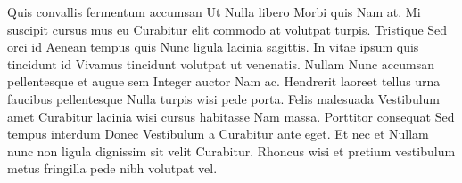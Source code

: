 Quis convallis fermentum accumsan Ut Nulla libero Morbi quis Nam at. Mi suscipit cursus mus eu Curabitur elit commodo at volutpat turpis. Tristique Sed orci id Aenean tempus quis Nunc ligula lacinia sagittis. In vitae ipsum quis tincidunt id Vivamus tincidunt volutpat ut venenatis. Nullam Nunc accumsan pellentesque et augue sem Integer auctor Nam ac. Hendrerit laoreet tellus urna faucibus pellentesque Nulla turpis wisi pede porta. Felis malesuada Vestibulum amet Curabitur lacinia wisi cursus habitasse Nam massa. Porttitor consequat Sed tempus interdum Donec Vestibulum a Curabitur ante eget. Et nec et Nullam nunc non ligula dignissim sit velit Curabitur. Rhoncus wisi et pretium vestibulum metus fringilla pede nibh volutpat vel.